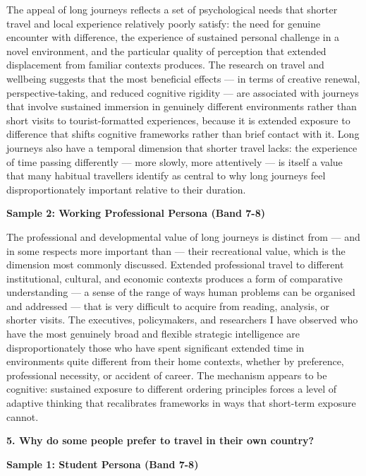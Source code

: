 The appeal of long journeys reflects a set of psychological needs that shorter travel and local experience relatively poorly satisfy: the need for genuine encounter with difference, the experience of sustained personal challenge in a novel environment, and the particular quality of perception that extended displacement from familiar contexts produces. The research on travel and wellbeing suggests that the most beneficial effects — in terms of creative renewal, perspective-taking, and reduced cognitive rigidity — are associated with journeys that involve sustained immersion in genuinely different environments rather than short visits to tourist-formatted experiences, because it is extended exposure to difference that shifts cognitive frameworks rather than brief contact with it. Long journeys also have a temporal dimension that shorter travel lacks: the experience of time passing differently — more slowly, more attentively — is itself a value that many habitual travellers identify as central to why long journeys feel disproportionately important relative to their duration.

\textbf{Sample 2: Working Professional Persona (Band 7-8)}

The professional and developmental value of long journeys is distinct from — and in some respects more important than — their recreational value, which is the dimension most commonly discussed. Extended professional travel to different institutional, cultural, and economic contexts produces a form of comparative understanding — a sense of the range of ways human problems can be organised and addressed — that is very difficult to acquire from reading, analysis, or shorter visits. The executives, policymakers, and researchers I have observed who have the most genuinely broad and flexible strategic intelligence are disproportionately those who have spent significant extended time in environments quite different from their home contexts, whether by preference, professional necessity, or accident of career. The mechanism appears to be cognitive: sustained exposure to different ordering principles forces a level of adaptive thinking that recalibrates frameworks in ways that short-term exposure cannot.

\separator

\begin{ieltsquestion}
\textbf{5. Why do some people prefer to travel in their own country?}
\end{ieltsquestion}
\textbf{Sample 1: Student Persona (Band 7-8)}

